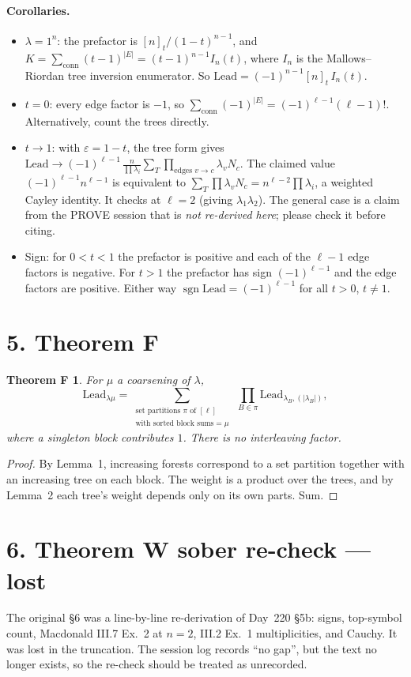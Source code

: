 \documentclass[10pt]{article}
\newcommand{\Lead}{\mathrm{Lead}}
\newtheorem*{thmF}{Theorem F}
\begin{document}
\paragraph{Corollaries.}
\begin{itemize}
\item $\lambda=1^n$: the prefactor is $[n]_t/(1-t)^{n-1}$, and
$K=\sum_{\text{conn}}(t-1)^{|E|}=(t-1)^{n-1}I_n(t)$, where $I_n$ is the Mallows--Riordan tree inversion enumerator.
So $\Lead=(-1)^{n-1}[n]_t\,I_n(t)$.
\item $t=0$: every edge factor is $-1$, so $\sum_{\text{conn}}(-1)^{|E|}=(-1)^{\ell-1}(\ell-1)!$. Alternatively, count
the trees directly.
\item $t\to1$: with $\varepsilon=1-t$, the tree form gives
$\Lead\to(-1)^{\ell-1}\,\frac{n}{\prod\lambda_i}\sum_T\prod_{\text{edges }v\to c}\lambda_vN_c$. The claimed value
$(-1)^{\ell-1}n^{\ell-1}$ is equivalent to $\sum_T\prod\lambda_vN_c=n^{\ell-2}\prod\lambda_i$, a weighted Cayley
identity. It checks at $\ell=2$ (giving $\lambda_1\lambda_2$). The general case is a claim from the PROVE session that
is \emph{not re-derived here}; please check it before citing.
\item Sign: for $0<t<1$ the prefactor is positive and each of the $\ell-1$ edge factors is negative. For $t>1$ the
prefactor has sign $(-1)^{\ell-1}$ and the edge factors are positive. Either way
$\operatorname{sgn}\Lead=(-1)^{\ell-1}$ for all $t>0$, $t\ne1$.
\end{itemize}

\section*{5. Theorem F}
\begin{thmF}
For $\mu$ a coarsening of $\lambda$,
\[
\Lead_{\lambda\mu}=\sum_{\substack{\text{set partitions }\pi\text{ of }[\ell]\\\text{with sorted block sums}=\mu}}\ \prod_{B\in\pi}\Lead_{\lambda_B,(|\lambda_B|)},
\]
where a singleton block contributes $1$. There is no interleaving factor.
\end{thmF}
\begin{proof}
By Lemma~1, increasing forests correspond to a set partition together with an increasing tree on each block. The
weight is a product over the trees, and by Lemma~2 each tree's weight depends only on its own parts. Sum.
\end{proof}

\section*{6. Theorem W sober re-check --- lost}
The original \S6 was a line-by-line re-derivation of Day~220 \S5b: signs, top-symbol count, Macdonald III.7 Ex.~2 at
$n=2$, III.2 Ex.~1 multiplicities, and Cauchy. It was lost in the truncation. The session log records ``no gap'', but the
text no longer exists, so the re-check should be treated as unrecorded.
\end{document}
